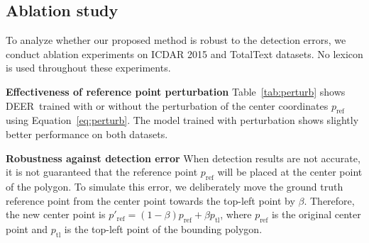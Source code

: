 \documentclass[10pt,twocolumn,letterpaper]{article}
\newcommand{\Table}[1]{Table~\ref{tab:#1}}
\newcommand{\Equation}[1]{Equation~\ref{eq:#1}}
\newcommand{\methodname}[0]{DEER}
\begin{document}
\begin{table}
\centering
{} \caption{
\textbf{Detection Supervision} -- Training the model to detect text instances is beneficial for the recognition of the text sequences.
} \label{tab:detect}
\end{table}





\subsection{Ablation study}

To analyze whether our proposed method is robust to the detection errors, we conduct ablation experiments on ICDAR 2015 and TotalText datasets. 
No lexicon is used throughout these experiments. 






\noindent\textbf{Effectiveness of reference point perturbation} 
\Table{perturb} shows \methodname~trained with or without the perturbation of the center coordinates \(p_\text{ref}\) using \Equation{perturb}. The model trained with perturbation shows slightly better performance on both datasets.

\noindent\textbf{Robustness against detection error}
When detection results are not accurate, it is not guaranteed that the reference point \(p_\text{ref}\) will be placed at the center point of the polygon. To simulate this error, we deliberately move the ground truth reference point from the center point towards the top-left point by \(\beta\). Therefore, the new center point is \(p'_\text{ref} = (1 - \beta) p_\text{ref} + \beta p_\text{tl}\), where \(p_\text{ref}\) is the original center point and \(p_\text{tl}\) is the top-left point of the bounding polygon.
\end{document}
